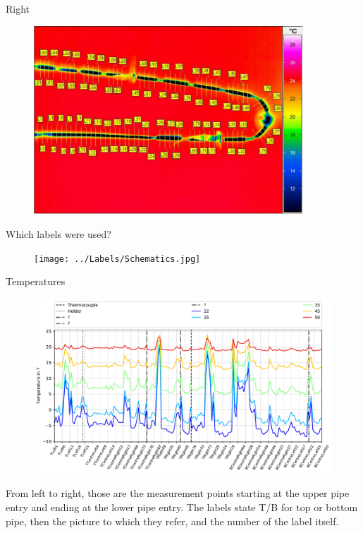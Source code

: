 \documentclass[10pt]{beamer}
\begin{document}
\begin{frame}{Right}
	\begin{figure}
		\centering
		\includegraphics[width=0.9\textwidth]{../Labels/LabelsRight.pdf}
	\end{figure}
\end{frame}
\begin{frame}{Which labels were used?}
	\begin{figure}
		\centering
		\texttt{[image: ../Labels/Schematics.jpg]}
	\end{figure}
\end{frame}
\begin{frame}{Temperatures}
	\begin{figure}
		\centering
		\includegraphics[width=\textwidth]{../test.pdf}
	\end{figure}
	From left to right, those are the measurement points starting at the upper pipe entry and ending at the lower pipe entry. The labels state T/B for top or bottom pipe, then the picture to which they refer, and the number of the label itself.
\end{frame}
\end{document}
